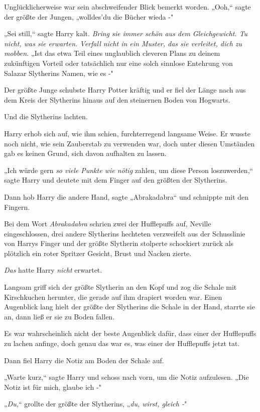 {Unglücklicherweise war sein abschweifender Blick bemerkt worden. „Ooh,“ sagte der größte der Jungen, „wolldes'du die Bücher wieda -"

„Sei still,“ sagte Harry kalt. \emph{Bring sie immer schön aus dem Gleichgewicht. Tu nicht, was sie erwarten. Verfall nicht in ein Muster, das sie verleitet, dich zu mobben.} „Ist das etwa Teil eines unglaublich cleveren Plans zu deinem zukünftigen Vorteil oder tatsächlich nur eine solch sinnlose Entehrung von Salazar Slytherins Namen, wie es -"

Der größte Junge schubste Harry Potter kräftig und er fiel der Länge nach aus dem Kreis der Slytherins hinaus auf den steinernen Boden von Hogwarts.

Und die Slytherins lachten.

Harry erhob sich auf, wie ihm schien, furchterregend langsame Weise. Er wusste noch nicht, wie sein Zauberstab zu verwenden war, doch unter diesen Umständen gab es keinen Grund, sich davon aufhalten zu lassen.

„Ich würde gern \emph{so viele Punkte wie nötig} zahlen, um diese Person loszuwerden,“ sagte Harry und deutete mit dem Finger auf den größten der Slytherins.

Dann hob Harry die andere Hand, sagte „Abrakadabra“ und schnippte mit den Fingern.

Bei dem Wort \emph{Abrakadabra} schrien zwei der Hufflepuffs auf, Neville eingeschlossen, drei andere Slytherins hechteten verzweifelt aus der Schusslinie von Harrys Finger und der größte Slytherin stolperte schockiert zurück als plötzlich ein roter Spritzer Gesicht, Brust und Nacken zierte.

\emph{Das} hatte Harry \emph{nicht} erwartet.

Langsam griff sich der größte Slytherin an den Kopf und zog die Schale mit Kirschkuchen herunter, die gerade auf ihm drapiert worden war. Einen Augenblick lang hielt der größte der Slytherins die Schale in der Hand, starrte sie an, dann ließ er sie zu Boden fallen.

Es war wahrscheinlich nicht der beste Augenblick dafür, dass einer der Hufflepuffs zu lachen anfinge, doch genau das war es, was einer der Hufflepuffs jetzt tat.

Dann fiel Harry die Notiz am Boden der Schale auf.

„Warte kurz,“ sagte Harry und schoss nach vorn, um die Notiz aufzulesen. „Die Notiz ist für mich, glaube ich -"

„\emph{Du,}“ grollte der größte der Slytherins, „\emph{du, wirst, gleich -}"

}
